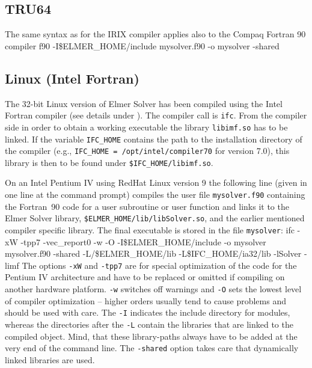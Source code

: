 \subsection{TRU64\label{programming:compile_TRU}}
The same syntax as for the IRIX compiler applies also to the Compaq Fortran 90 compiler
\ttbegin
f90 -I\$ELMER_HOME/include mysolver.f90 -o mysolver -shared
\ttend
\subsection{Linux (Intel Fortran)\label{programming:compile_Linux}}
The  32-bit Linux version of Elmer Solver has been compiled using the Intel Fortran compiler (see details under ). The compiler call is \texttt{ifc}.  From the compiler side in order to obtain a working executable the library \texttt{libimf.so} has to be linked. If the variable \texttt{IFC\_HOME} contains the path to the installation directory of the compiler (e.g., \texttt{IFC\_HOME = /opt/intel/compiler70} for version 7.0), this library is then to be found under \texttt{\$IFC\_HOME/libimf.so}.

On an Intel Pentium IV using RedHat Linux version 9 the following line (given in one line at the command prompt) compiles the user file \texttt{mysolver.f90} containing the Fortran~90 code for a user subroutine or user function and links it to the Elmer Solver library, \texttt{\$ELMER\_HOME/lib/libSolver.so}, and the earlier mentioned compiler specific library. The final executable is stored in the file \texttt{mysolver}:
\ttbegin
ifc -xW -tpp7 -vec_report0 -w -O -I\$ELMER\_HOME/include -o mysolver 
    mysolver.f90 -shared -L/\$ELMER\_HOME/lib -L\$IFC\_HOME/ia32/lib
    -lSolver -limf
\ttend
The options \texttt{-xW} and \texttt{-tpp7} are for special optimization of the code for the Pentium IV architecture and have to be replaced or omitted if compiling on another hardware platform. \texttt{-w} switches off warnings and \texttt{-O} sets the lowest level of compiler optimization -- higher orders usually tend to cause problems and should be used with care. The \texttt{-I} indicates the include directory for modules, whereas the directories after the \texttt{-L} contain the libraries that are linked to the compiled object. Mind, that these library-paths always have to be added at the very end of the command line. The \texttt{-shared} option takes care that dynamically linked libraries are used.
